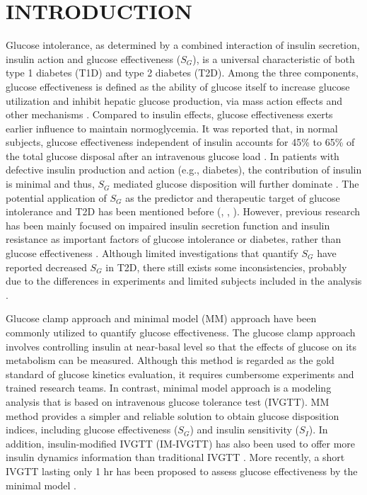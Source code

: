 \documentclass[utf8]{frontiersSCNS} %
\begin{document}
\section{INTRODUCTION} %
Glucose intolerance, as determined by a combined interaction of insulin secretion, insulin action and glucose effectiveness ($S_G$), is a universal characteristic of both type 1 diabetes (T1D) and type 2 diabetes (T2D). Among the three components, glucose effectiveness is defined as the ability of glucose itself to increase glucose utilization and inhibit hepatic glucose production, via mass action effects and other mechanisms \citep{Dube2015}. Compared to insulin effects, glucose effectiveness exerts earlier influence to maintain normoglycemia. It was reported that, in normal subjects, glucose effectiveness independent of insulin accounts for 45\% to 65\% of the total glucose disposal after an intravenous glucose load \citep{Alford_2018}. In patients with defective insulin production and action (e.g., diabetes), the contribution of insulin is minimal and thus, $S_G$ mediated glucose disposition will further dominate \citep{Dube2015}. The potential application of $S_G$ as the predictor and therapeutic target of glucose intolerance and T2D has been mentioned before (\citet{basu_2009}, \citet{pau_2014}, \citet{Alford_2018}). However, previous research has been mainly focused on impaired insulin secretion function and insulin resistance as important factors of glucose intolerance or diabetes, rather than glucose effectiveness \citep{Alford_2018}. Although limited investigations that quantify $S_G$ have reported decreased $S_G$ in T2D, there still exists some inconsistencies, probably due to the differences in experiments and limited subjects included in the analysis \citep{Dube2015}. 

Glucose clamp approach and minimal model (MM) approach have been commonly utilized to quantify glucose effectiveness. The glucose clamp approach involves controlling insulin at near-basal level so that the effects of glucose on its metabolism can be measured. Although this method is regarded as the gold standard of glucose kinetics evaluation, it requires cumbersome experiments and trained research teams. In contrast, minimal model approach is a modeling analysis that is based on intravenous glucose tolerance test (IVGTT). MM method provides a simpler and reliable solution to obtain glucose disposition indices, including glucose effectiveness ($S_G$) and insulin sensitivity ($S_I$). In addition, insulin-modified IVGTT (IM-IVGTT) has also been used to offer more insulin dynamics information than traditional IVGTT \citep{Vicini1999}. More recently, a short IVGTT lasting only 1 hr has been proposed to assess glucose effectiveness by the minimal model \citep{Morettini2018}. 
\end{document}
